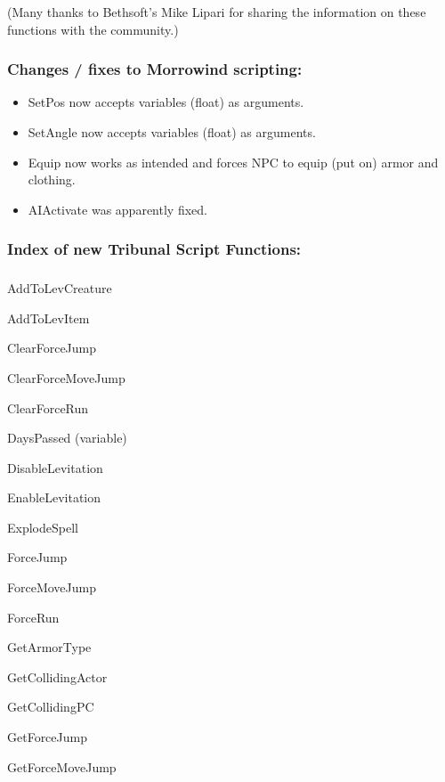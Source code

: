 \documentclass[
]{article}
\begin{document}
(Many thanks to Bethsoft's Mike Lipari for sharing the information on
these functions with the community.)

\hypertarget{changes-fixes-to-morrowind-scripting}{%
\subsubsection{Changes / fixes to Morrowind
scripting:}\label{changes-fixes-to-morrowind-scripting}}

\begin{itemize}
\item
  SetPos now accepts variables (float) as arguments.
\item
  SetAngle now accepts variables (float) as arguments.
\item
  Equip now works as intended and forces NPC to equip (put on) armor and
  clothing.
\item
  AIActivate was apparently fixed.
\end{itemize}

\hypertarget{index-of-new-tribunal-script-functions}{%
\subsubsection{Index of new Tribunal Script
Functions:}\label{index-of-new-tribunal-script-functions}}

\hypertarget{section-13}{%
\subsubsection{}\label{section-13}}

AddToLevCreature

AddToLevItem

ClearForceJump

ClearForceMoveJump

ClearForceRun

DaysPassed (variable)

DisableLevitation

EnableLevitation

ExplodeSpell

ForceJump

ForceMoveJump

ForceRun

GetArmorType

GetCollidingActor

GetCollidingPC

GetForceJump

GetForceMoveJump
\end{document}
